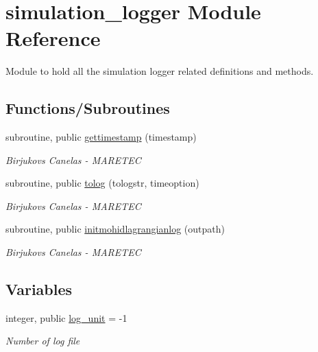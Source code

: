 \hypertarget{namespacesimulation__logger}{}\section{simulation\+\_\+logger Module Reference}
\label{namespacesimulation__logger}


Module to hold all the simulation logger related definitions and methods.  


\subsection*{Functions/\+Subroutines}
\begin{DoxyCompactItemize}
\item 
subroutine, public \mbox{\hyperlink{namespacesimulation__logger_a13446c36aac51547a72b39003f735257}{gettimestamp}} (timestamp)
\begin{DoxyCompactList}\small\item\em Birjukovs Canelas -\/ M\+A\+R\+E\+T\+EC \end{DoxyCompactList}\item 
subroutine, public \mbox{\hyperlink{namespacesimulation__logger_a3aaa69ec168b6f34d703fb4033a22d92}{tolog}} (tologstr, timeoption)
\begin{DoxyCompactList}\small\item\em Birjukovs Canelas -\/ M\+A\+R\+E\+T\+EC \end{DoxyCompactList}\item 
subroutine, public \mbox{\hyperlink{namespacesimulation__logger_a9c7922c1d3cd57c8322f047799fc6053}{initmohidlagrangianlog}} (outpath)
\begin{DoxyCompactList}\small\item\em Birjukovs Canelas -\/ M\+A\+R\+E\+T\+EC \end{DoxyCompactList}\end{DoxyCompactItemize}
\subsection*{Variables}
\begin{DoxyCompactItemize}
\item 
integer, public \mbox{\hyperlink{namespacesimulation__logger_a9ef3d703b0c79dd563330003a82c99d9}{log\+\_\+unit}} = -\/1
\begin{DoxyCompactList}\small\item\em \textquotesingle{}Number\textquotesingle{} of log file \end{DoxyCompactList}\end{DoxyCompactItemize}


